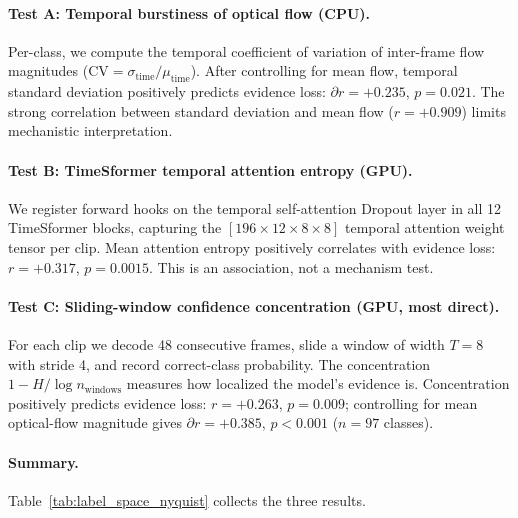 \documentclass[runningheads]{llncs}
\newcommand{\rev}[1]{\textcolor{revblue}{#1}}
\newcommand{\revdel}[1]{}
\begin{document}
\paragraph{Test A: Temporal burstiness of optical flow (CPU).} Per-class, we compute the temporal coefficient of variation of inter-frame flow magnitudes ($\mathrm{CV} = \sigma_\mathrm{time}/\mu_\mathrm{time}$). After controlling for mean flow, temporal standard deviation positively predicts \rev{evidence loss}\revdel{aliasing}: $\partial r = +0.235$, $p=0.021$. The strong correlation between standard deviation and mean flow ($r=+0.909$) limits mechanistic interpretation.

\paragraph{Test B: TimeSformer temporal attention entropy (GPU).} We register forward hooks on the temporal self-attention Dropout layer in all 12 TimeSformer blocks, capturing the $[196\times12\times8\times8]$ temporal attention weight tensor per clip. Mean attention entropy positively correlates with \rev{evidence loss}\revdel{aliasing}: $r=+0.317$, $p=0.0015$. This is an association, not a mechanism test.

\paragraph{Test C: Sliding-window confidence concentration (GPU, most direct).} For each clip we decode 48 consecutive frames, slide a window of width $T=8$ with stride 4, and record correct-class probability. The concentration $1-H/\log n_\mathrm{windows}$ measures how localized the model's evidence is. Concentration positively predicts \rev{evidence loss}\revdel{aliasing}: $r=+0.263$, $p=0.009$; controlling for mean optical-flow magnitude gives $\partial r=+0.385$, $p<0.001$ ($n=97$ classes).

\paragraph{Summary.} Table~\ref{tab:label_space_nyquist} collects the three results.
\end{document}
